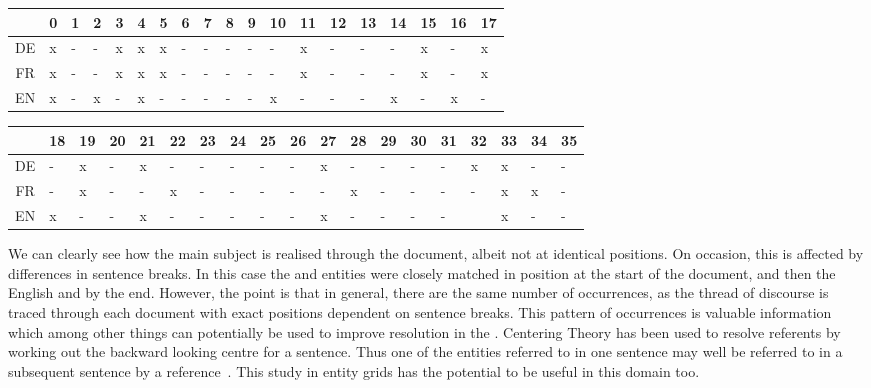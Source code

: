 \documentclass[output=paper]{langsci/langscibook.cls}
\begin{document}
\begin{table*}
% 	
		\begin{tabular}{|c|p{0.15cm}|p{0.15cm}|p{0.15cm}|p{0.15cm}|p{0.15cm}|p{0.15cm}|p{0.15cm}|p{0.15cm}|p{0.15cm}|p{0.15cm}|p{0.15cm}|p{0.15cm}|p{0.15cm}|p{0.15cm}|p{0.15cm}|p{0.15cm}|p{0.15cm}|p{0.15cm}|}
			\hline  \bf &\bf 0 &\bf 1& \bf 2& \bf 3& \bf 4& \bf 5 & \bf 6 & \bf 7 & \bf 8 & \bf 9 & \bf 10 & \bf 11 & \bf 12& \bf 13 & \bf 14 & \bf 15 & \bf 16 &\bf 17 \\   \hline
			DE &x&-&-&x&x&x&-&-&-&-&-&x&-&-&-&x&-&x \\
			FR &x&-&-&x&x&x&-&-&-&-&-&x&-&-&-&x&-&x \\
			EN &x&-&x&-&x&-&-&-&-&-&x&-&-&-&x&-&x&- \\ \hline
			\end{tabular}
% 		
	
			
% 	
		\begin{tabular}{|c|p{0.15cm}|p{0.15cm}|p{0.15cm}|p{0.15cm}|p{0.15cm}|p{0.15cm}|p{0.15cm}|p{0.15cm}|p{0.15cm}|p{0.15cm}|p{0.15cm}|p{0.15cm}|p{0.15cm}|p{0.15cm}|p{0.15cm}|p{0.15cm}|p{0.15cm}|p{0.15cm}|}
			\hline  \bf  & \bf 18 & \bf 19 & \bf 20 & \bf 21 & \bf 22 & \bf 23 & \bf 24 & \bf 25 & \bf 26 & \bf 27 & \bf 28 & \bf 29 & \bf 30 & \bf 31 & \bf 32 & \bf 33 & \bf 34 & \bf 35 \\   \hline
			DE &-&x&-&x&-&-&-&-&-&x&-&-&-&-&x&x&-&-   \\
			FR &-&x&-&-&x&-&-&-&-&-&x&-&-&-&-&x&x&-   \\
			EN &x&-&-&x&-&-&-&-&-&x&-&-&-&-&&x&-&-   \\ \hline
		\end{tabular}
% 	
	\caption{\label{table:Brown}Occurrences of 'Brown' in various sentences of parallel document (dropping last sentences of document due to spacing)}
\end{table*}

We can clearly see how the main subject is realised through the document, albeit not at identical positions. On occasion, this is affected by differences in sentence breaks. In this case the  and  entities were closely matched in position at the start of the document, and then the English and  by the end. However, the point is that in general, there are the same number of occurrences, as the thread of discourse is traced through each document with exact positions dependent on sentence breaks. This pattern of occurrences is valuable information which among other things can potentially be used to improve  resolution in the . Centering Theory has been used \citep{Kehler} to resolve referents by working out the backward looking centre for a sentence. Thus one of the entities referred to in one sentence may well be referred to in a subsequent sentence by a reference~\citep{Clarke}. This study in entity grids has the potential to be useful in this domain too.
\end{document}
